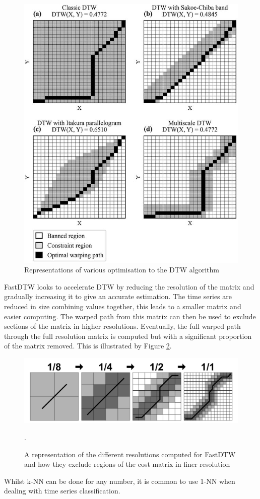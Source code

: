 \begin{figure}[h]
    \centering
    \includegraphics[width=0.5\linewidth]{dissertation//figures/dtw.png}
    \caption{Representations of various optimisation to the DTW algorithm\cite{faouzi2024time}}
    \label{fig:dtw}
\end{figure}

FastDTW looks to accelerate DTW by reducing the resolution of the matrix and gradually increasing it to give an accurate estimation\cite{salvador2007toward}. The time series are reduced in size combining values together, this leads to a smaller matrix and easier computing. The warped path from this matrix can then be used to exclude sections of the matrix in higher resolutions. Eventually, the full warped path through the full resolution matrix is computed but with a significant proportion of the matrix removed. This is illustrated by Figure \ref{fig:fast-dtw}.

\begin{figure}[h]
    \centering
    \includegraphics[width=0.75\linewidth]{dissertation//figures/fast-dtw.png}
    \caption{A representation of the different resolutions computed for FastDTW and how they exclude regions of the cost matrix in finer resolution\cite{salvador2007toward}}.
    \label{fig:fast-dtw}
\end{figure}

Whilst k-NN can be done for any number, it is common to use 1-NN when dealing with time series classification.

